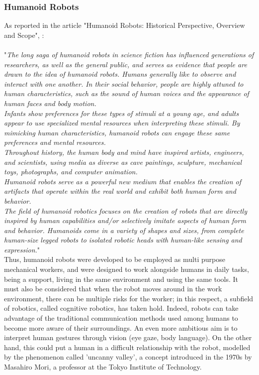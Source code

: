 \subsubsection{Humanoid Robots}
As reported in the article "Humanoid Robots: Historical Perspective, Overview and Scope", \citet{Siciliano2020}:\\
\\
"\textit{The long saga of humanoid robots in science fiction has influenced generations
of researchers, as well as the general public, and serves as evidence that people
are drawn to the idea of humanoid robots. Humans generally like to observe and
interact with one another. In their social behavior, people are highly attuned to
human characteristics, such as the sound of human voices and the appearance of
human faces and body motion. \\
Infants show preferences for these types of stimuli at
a young age, and adults appear to use specialized mental resources when interpreting these stimuli. By mimicking human characteristics, humanoid robots can engage
these same preferences and mental resources.\\
Throughout history, the human body and mind have inspired artists, engineers,
and scientists, using media as diverse as cave paintings, sculpture, mechanical toys,
photographs, and computer animation. \\
Humanoid robots serve as a powerful new
medium that enables the creation of artifacts that operate within the real world
and exhibit both human form and behavior. 
\\The field of humanoid robotics focuses
on the creation of robots that are directly inspired by human capabilities and/or
selectively imitate aspects of human form and behavior. Humanoids come in a
variety of shapes and sizes, from complete human-size legged robots to isolated
robotic heads with human-like sensing and expression.}"\\
Thus, humanoid robots were developed to be employed as multi purpose mechanical workers, and were designed to work alongside humans in daily tasks, being a support, living in the same environment and using the same tools.
It must also be considered that when the robot moves around in the work environment, there can be multiple risks for the worker; in this respect, a subfield of robotics, called cognitive robotics, has taken hold.
Indeed, robots can take advantage of the traditional communication methods used among humans to become more aware of their surroundings.
An even more ambitious aim is to interpret human gestures through vision (eye gaze, body language). On the other hand, this could put a human in a difficult relationship with the robot, modelled by the phenomenon called 'uncanny valley', a concept introduced in the 1970s by Masahiro Mori, a professor at the Tokyo Institute of Technology.

